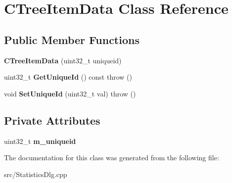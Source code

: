 \section{CTreeItemData Class Reference}
\label{classCTreeItemData}
\subsection*{Public Member Functions}
\begin{DoxyCompactItemize}
\item 
{\bfseries CTreeItemData} (uint32\_\-t uniqueid)\label{classCTreeItemData_a943fa4c4208fc81d90afe8ade102f0ca}

\item 
uint32\_\-t {\bfseries GetUniqueId} () const   throw ()\label{classCTreeItemData_aa3a9ae446f0c2da4bf90d1d8c49ceec0}

\item 
void {\bfseries SetUniqueId} (uint32\_\-t val)  throw ()\label{classCTreeItemData_a344c16ee9e9be24576b3f11015e9955e}

\end{DoxyCompactItemize}
\subsection*{Private Attributes}
\begin{DoxyCompactItemize}
\item 
uint32\_\-t {\bfseries m\_\-uniqueid}\label{classCTreeItemData_a208bbdb0f9c7e3590382ce1f8cf38b7f}

\end{DoxyCompactItemize}


The documentation for this class was generated from the following file:\begin{DoxyCompactItemize}
\item 
src/StatisticsDlg.cpp\end{DoxyCompactItemize}
